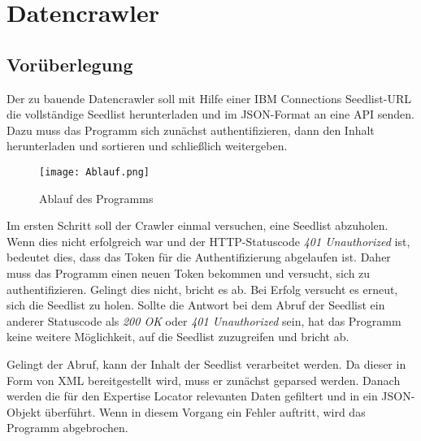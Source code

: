 
\chapter{Datencrawler}

\section{Vorüberlegung}
\large
Der zu bauende Datencrawler soll mit Hilfe einer IBM Connections Seedlist-\ac{URL} die vollständige Seedlist herunterladen und im JSON-Format an eine API senden. Dazu muss das Programm sich zunächst authentifizieren, dann den Inhalt herunterladen und sortieren und schließlich weitergeben.\\
\begin{figure}[ht]
\centering
\texttt{[image: Ablauf.png]}
\caption{Ablauf des Programms}
\end{figure}

Im ersten Schritt soll der Crawler einmal versuchen, eine Seedlist abzuholen. Wenn dies nicht erfolgreich war und der HTTP-Statuscode \textit{401 Unauthorized} ist, bedeutet dies, dass das Token für die Authentifizierung abgelaufen ist. Daher muss das Programm einen neuen Token bekommen und versucht, sich zu authentifizieren. Gelingt dies nicht, bricht es ab. Bei Erfolg versucht es erneut, sich die Seedlist zu holen. Sollte die Antwort bei dem Abruf der Seedlist ein anderer Statuscode als \textit{200 OK} oder \textit{401 Unauthorized} sein, hat das Programm keine weitere Möglichkeit, auf die Seedlist zuzugreifen und bricht ab.

Gelingt der Abruf, kann der Inhalt der Seedlist verarbeitet werden. Da dieser in Form von XML bereitgestellt wird, muss er zunächst geparsed werden. Danach werden die für den Expertise Locator relevanten Daten gefiltert und in ein JSON-Objekt überführt. Wenn in diesem Vorgang ein Fehler auftritt, wird das Programm abgebrochen.